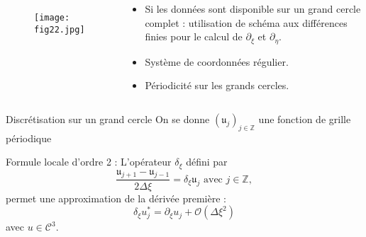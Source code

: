\documentclass[11pt]{beamer}
\begin{document}
\begin{frame}
\begin{columns}
\begin{figure}
\begin{center}
\texttt{[image: fig22.jpg]}
\end{center}
\end{figure}

\begin{block}{}
\begin{itemize}
\item Si les données sont disponible sur un grand cercle complet : utilisation de schéma aux différences finies pour le calcul de $\partial_{\xi}$ et $\partial_{\eta}$.

\item Système de coordonnées régulier.

\item Périodicité sur les grands cercles.
\end{itemize}

\end{block}



\end{columns}
\end{frame}














\begin{frame}{Discrétisation sur un grand cercle}
On se donne $(\mathfrak{u}_j)_{j\in \mathbb{Z}}$ une fonction de grille périodique
\begin{figure}[htbp]
\begin{center}
\end{center}
\end{figure}

\begin{block}{Formule locale d'ordre 2 :}
L'opérateur $\delta_{\xi}$ défini par
$$
\dfrac{\mathfrak{u}_{j+1}-\mathfrak{u}_{j-1}}{2 \Delta \xi} = \delta_{\xi} \mathfrak{u}_j \text{ avec } j \in \mathbb{Z},
$$
permet une approximation de la dérivée première :
$$
\delta_{\xi} u^*_j = \partial_{\xi} u_j + \mathcal{O} \left( \Delta \xi^2 \right)
$$
avec $u \in \mathcal{C}^3$.
\end{block}
\end{frame}
\end{document}
